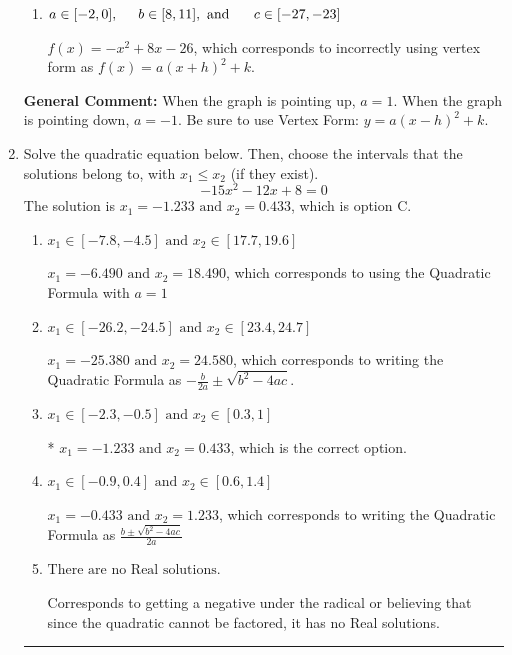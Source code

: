\documentclass{extbook}[14pt]
\newcommand{\litem}[1]{\item #1

\rule{\textwidth}{0.4pt}}
\begin{document}
\begin{enumerate}
{\begin{enumerate}[label=\Alph*.]
$f(x)=x^{2} +8 x + 6$, which corresponds to making $a$ the opposite sign than it should be.
\item \( a \in [-2, 0], \hspace*{5mm} b \in [8, 11], \text{ and } \hspace*{5mm} c \in [-27, -23] \)

$f(x)=-x^{2} +8 x -26$, which corresponds to incorrectly using vertex form as $f(x) = a(x+h)^2+k$.
\end{enumerate}

\textbf{General Comment:} When the graph is pointing up, $a=1$. When the graph is pointing down, $a=-1$. Be sure to use Vertex Form: $y = a(x-h)^2+k$.
}
\litem{
Solve the quadratic equation below. Then, choose the intervals that the solutions belong to, with $x_1 \leq x_2$ (if they exist).
\[ -15x^{2} -12 x + 8 = 0 \]The solution is \( x_1 = -1.233 \text{ and } x_2 = 0.433 \), which is option C.\begin{enumerate}[label=\Alph*.]
\item \( x_1 \in [-7.8, -4.5] \text{ and } x_2 \in [17.7, 19.6] \)

 $x_1 = -6.490 \text{ and } x_2 = 18.490$, which corresponds to using the Quadratic Formula with $a=1$
\item \( x_1 \in [-26.2, -24.5] \text{ and } x_2 \in [23.4, 24.7] \)

 $x_1 = -25.380 \text{ and } x_2 = 24.580$, which corresponds to writing the Quadratic Formula as $-\frac{b}{2a} \pm \sqrt{b^2 - 4ac}$.
\item \( x_1 \in [-2.3, -0.5] \text{ and } x_2 \in [0.3, 1] \)

* $x_1 = -1.233 \text{ and } x_2 = 0.433$, which is the correct option.
\item \( x_1 \in [-0.9, 0.4] \text{ and } x_2 \in [0.6, 1.4] \)

 $x_1 = -0.433 \text{ and } x_2 = 1.233$, which corresponds to writing the Quadratic Formula as $\frac{b \pm \sqrt{b^2 - 4ac}}{2a}$
\item \( \text{There are no Real solutions.} \)

Corresponds to getting a negative under the radical or believing that since the quadratic cannot be factored, it has no Real solutions.
\end{enumerate}

}
\end{enumerate}
\end{document}

